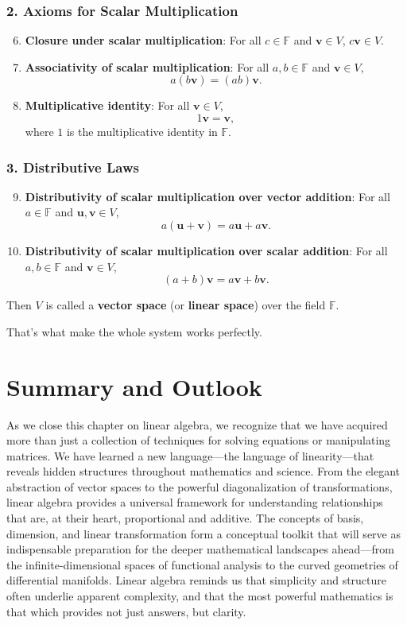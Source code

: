 \subsubsection*{2. Axioms for Scalar Multiplication}
\begin{enumerate}
    \setcounter{enumi}{5}
    \item \textbf{Closure under scalar multiplication}: For all $c \in \mathbb{F}$ and $\mathbf{v} \in V$, $c \mathbf{v} \in V$.
    \item \textbf{Associativity of scalar multiplication}: For all $a, b \in \mathbb{F}$ and $\mathbf{v} \in V$,
    \[
    a (b \mathbf{v}) = (ab) \mathbf{v}.
    \]
    \item \textbf{Multiplicative identity}: For all $\mathbf{v} \in V$,
    \[
    1 \mathbf{v} = \mathbf{v},
    \]
    where $1$ is the multiplicative identity in $\mathbb{F}$.
\end{enumerate}

\subsubsection*{3. Distributive Laws}
\begin{enumerate}
    \setcounter{enumi}{8}
    \item \textbf{Distributivity of scalar multiplication over vector addition}: For all $a \in \mathbb{F}$ and $\mathbf{u}, \mathbf{v} \in V$,
    \[
    a (\mathbf{u} + \mathbf{v}) = a \mathbf{u} + a \mathbf{v}.
    \]
    \item \textbf{Distributivity of scalar multiplication over scalar addition}: For all $a, b \in \mathbb{F}$ and $\mathbf{v} \in V$,
    \[
    (a + b) \mathbf{v} = a \mathbf{v} + b \mathbf{v}.
    \]
\end{enumerate}

Then $V$ is called a \textbf{vector space} (or \textbf{linear space}) over the field $\mathbb{F}$.

That's what make the whole system works perfectly.

\section{Summary and Outlook}

As we close this chapter on linear algebra, we recognize that we have acquired more than just a collection of techniques for solving equations or manipulating matrices. We have learned a new language—the language of linearity—that reveals hidden structures throughout mathematics and science. From the elegant abstraction of vector spaces to the powerful diagonalization of transformations, linear algebra provides a universal framework for understanding relationships that are, at their heart, proportional and additive. The concepts of basis, dimension, and linear transformation form a conceptual toolkit that will serve as indispensable preparation for the deeper mathematical landscapes ahead—from the infinite-dimensional spaces of functional analysis to the curved geometries of differential manifolds. Linear algebra reminds us that simplicity and structure often underlie apparent complexity, and that the most powerful mathematics is that which provides not just answers, but clarity.

